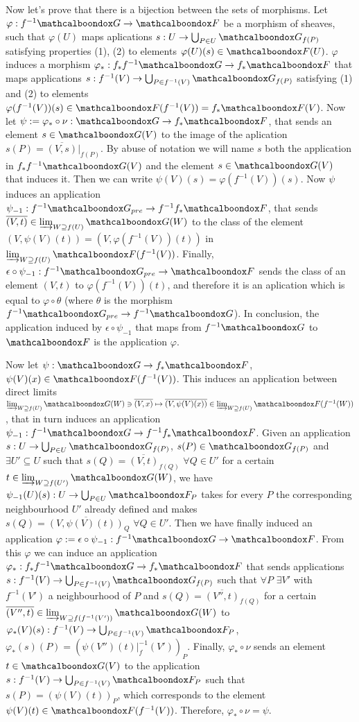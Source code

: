 \begin{sol}
	\vspace{3mm}

	Now let's prove that there is a bijection between the sets of morphisms. Let $\varphi: f^{-1}\sG \to \sF$ be a morphism of sheaves, such that $\varphi(U)$ maps aplications $s: U \to \bigcup_{P \in U} \sG_{f(P)}$ satisfying properties (1), (2) to elements $\varphi(U)(s) \in \sF(U)$.  $\varphi$ induces a morphism $\varphi_*: f_*f^{-1}\sG \to f_{*}\sF$ that maps applications $s: f^{-1}(V) \to \bigcup_{P \in f^{-1}(V)} \sG_{f(P)}$ satisfying (1) and (2) to elements $\varphi(f^{-1}(V))(s) \in \sF(f^{-1}(V)) = f_* \sF(V)$. Now let $\psi := \varphi_* \circ \nu : \sG \to f_* \sF$, that sends an element $s \in \sG(V)$ to the image of the aplication $s(P) = \overline{(V,s)}|_{f(P)}$. By abuse of notation we will name $s$ both the application in $f_*f^{-1}\sG(V)$ and the element $s \in \sG(V)$ that induces it. Then we can write $\psi(V)(s) = \varphi(f^{-1}(V))(s)$. Now $\psi$ induces an application $\psi_{-1}: f^{-1}\sG_{pre} \to f^{-1}f_*\sF$, that sends $\overline{(V,t)} \in \varinjlim_{W \supseteq f(U)} \sG(W)$ to the class of the element $(V,\psi(V)(t)) = (V, \varphi(f^{-1}(V))(t))$ in $\varinjlim_{W \supseteq f(U)} \sF(f^{-1}(V))$. Finally, $\epsilon \circ \psi_{-1}: f^{-1}\sG_{pre} \to \sF$ sends the class of an element $(V,t)$ to $\varphi(f^{-1}(V))(t)$, and therefore it is an aplication which is equal to $\varphi \circ \theta$ (where $\theta$ is the morphism $f^{-1}\sG_{pre} \to f^{-1}\sG$). In conclusion, the application induced by $\epsilon \circ \psi_{-1}$ that maps from $f^{-1}\sG$ to $\sF$ is the application $\varphi$.

	Now let $\psi: \sG \to f_* \sF$, $\psi(V)(x) \in \sF(f^{-1}(V))$. This induces an application between direct limits $\varinjlim_{W \supseteq f(U)} \sG(W) \ni \overline{(V,x)} \mapsto \overline{(V,\psi(V)(x))} \in \varinjlim_{W \supseteq f(U)} \sF(f^{-1}(W))$, that in turn induces an application $\psi_{-1}: f^{-1}\sG \to f^{-1}f_*\sF$. Given an application $s: U \to \bigcup_{P \in U} \sG_{f(P)}$, $s(P) \in \sG_{f(P)}$ and $\exists U'\subseteq U$ such that $s(Q) = \overline{(V,t)}_{f(Q)} \, \, \forall Q \in U'$ for a certain $t \in \varinjlim_{W \supseteq f(U')} \sG(W)$, we have $\psi_{-1}(U)(s): U \to \bigcup_{P \in U} \sF_P$ takes for every $P$ the corresponding neighbourhood $U'$ already defined and makes $s(Q) = \overline{(V, \psi(V)(t))}_{Q} \, \, \forall Q \in U'$. Then we have finally induced an application $\varphi:= \epsilon \circ \psi_{-1}: f^{-1}\sG \to \sF$. From this $\varphi$ we can induce an application $\varphi_*: f_*f^{-1}\sG \to f_* \sF$ that sends applications $s: f^{-1}(V) \to \bigcup_{P \in f^{-1}(V)} \sG_{f(P)}$ such that $\forall P$ $\exists V'$ with $f^{-1}(V')$ a neighbourhood of $P$ and $s(Q) = \overline{(V'',t)}_{f(Q)}$ for a certain $\overline{(V'',t)} \in \varinjlim_{W \supseteq f(f^{-1}(V'))} \sG(W)$ to $\varphi_*(V)(s): f^{-1}(V) \to \bigcup_{P \in f^{-1}(V)} \sF_P$, $\varphi_*(s)(P) = (\psi(V'')(t)|_f^{-1}(V'))_P$. Finally, $\varphi_* \circ \nu$ sends an element $t \in \sG(V)$ to the application $s: f^{-1}(V) \to \bigcup_{P \in f^{-1}(V)} \sF_P$ such that $s(P) = (\psi(V)(t))_{P}$, which corresponds to the element $\psi(V)(t) \in \sF(f^{-1}(V))$. Therefore, $\varphi_* \circ \nu = \psi$.


\end{sol}
